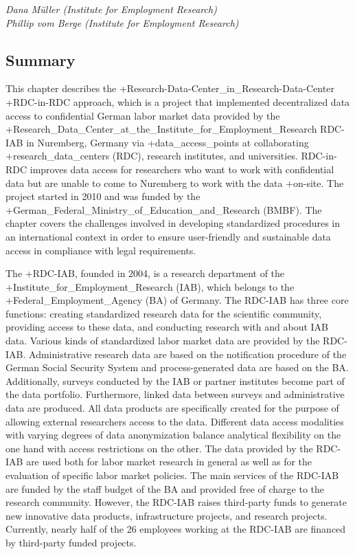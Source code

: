 \documentclass[
]{WileySix}
\begin{document}
\emph{Dana Müller (Institute for Employment Research)}\\
\emph{Phillip vom Berge (Institute for Employment Research)}

\hypertarget{summary-1}{%
\subsection{Summary}\label{summary-1}}

This chapter describes the +Research-Data-Center\_in\_Research-Data-Center\textbar{} +RDC-in-RDC\textbar{} approach, which is a project that implemented decentralized data access to confidential German labor market data provided by the +Research\_Data\_Center\_at\_the\_Institute\_for\_Employment\_Research\textbar{} RDC-IAB in Nuremberg, Germany via +data\_access\_points\textbar{} at collaborating +research\_data\_centers\textbar{} (RDC), research institutes, and universities. RDC-in-RDC improves data access for researchers who want to work with confidential data but are unable to come to Nuremberg to work with the data +on-site\textbar. The project started in 2010 and was funded by the +German\_Federal\_Ministry\_of\_Education\_and\_Research\textbar{} (BMBF). The chapter covers the challenges involved in developing standardized procedures in an international context in order to ensure user-friendly and sustainable data access in compliance with legal requirements.

The +RDC-IAB\textbar, founded in 2004, is a research department of the +Institute\_for\_Employment\_Research\textbar{} (IAB), which belongs to the +Federal\_Employment\_Agency\textbar{} (BA) of Germany. The RDC-IAB has three core functions: creating standardized research data for the scientific community, providing access to these data, and conducting research with and about IAB data. Various kinds of standardized labor market data are provided by the RDC-IAB. Administrative research data are based on the notification procedure of the German Social Security System and process-generated data are based on the BA. Additionally, surveys conducted by the IAB or partner institutes become part of the data portfolio. Furthermore, linked data between surveys and administrative data are produced. All data products are specifically created for the purpose of allowing external researchers access to the data. Different data access modalities with varying degrees of data anonymization balance analytical flexibility on the one hand with access restrictions on the other. The data provided by the RDC-IAB are used both for labor market research in general as well as for the evaluation of specific labor market policies. The main services of the RDC-IAB are funded by the staff budget of the BA and provided free of charge to the research community. However, the RDC-IAB raises third-party funds to generate new innovative data products, infrastructure projects, and research projects. Currently, nearly half of the 26 employees working at the RDC-IAB are financed by third-party funded projects.
\end{document}
